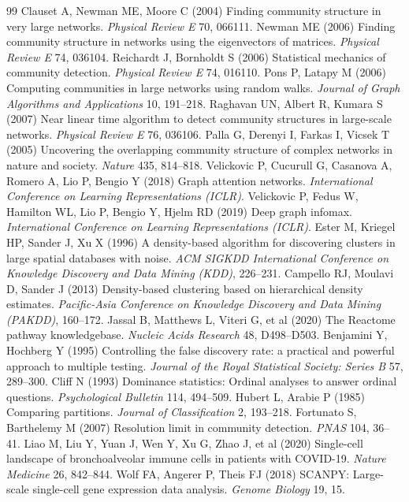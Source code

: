 \documentclass[twocolumn,10pt,letterpaper]{article}
\begin{document}
{\begin{thebibliography}{99}
 Clauset A, Newman ME, Moore C (2004) Finding community structure in very large networks. \textit{Physical Review E} 70, 066111.
 Newman ME (2006) Finding community structure in networks using the eigenvectors of matrices. \textit{Physical Review E} 74, 036104.
 Reichardt J, Bornholdt S (2006) Statistical mechanics of community detection. \textit{Physical Review E} 74, 016110.
 Pons P, Latapy M (2006) Computing communities in large networks using random walks. \textit{Journal of Graph Algorithms and Applications} 10, 191--218.
 Raghavan UN, Albert R, Kumara S (2007) Near linear time algorithm to detect community structures in large-scale networks. \textit{Physical Review E} 76, 036106.
 Palla G, Derenyi I, Farkas I, Vicsek T (2005) Uncovering the overlapping community structure of complex networks in nature and society. \textit{Nature} 435, 814--818.
 Velickovic P, Cucurull G, Casanova A, Romero A, Lio P, Bengio Y (2018) Graph attention networks. \textit{International Conference on Learning Representations (ICLR)}.
 Velickovic P, Fedus W, Hamilton WL, Lio P, Bengio Y, Hjelm RD (2019) Deep graph infomax. \textit{International Conference on Learning Representations (ICLR)}.
 Ester M, Kriegel HP, Sander J, Xu X (1996) A density-based algorithm for discovering clusters in large spatial databases with noise. \textit{ACM SIGKDD International Conference on Knowledge Discovery and Data Mining (KDD)}, 226--231.
 Campello RJ, Moulavi D, Sander J (2013) Density-based clustering based on hierarchical density estimates. \textit{Pacific-Asia Conference on Knowledge Discovery and Data Mining (PAKDD)}, 160--172.
 Jassal B, Matthews L, Viteri G, et al (2020) The Reactome pathway knowledgebase. \textit{Nucleic Acids Research} 48, D498--D503.
 Benjamini Y, Hochberg Y (1995) Controlling the false discovery rate: a practical and powerful approach to multiple testing. \textit{Journal of the Royal Statistical Society: Series B} 57, 289--300.
 Cliff N (1993) Dominance statistics: Ordinal analyses to answer ordinal questions. \textit{Psychological Bulletin} 114, 494--509.
 Hubert L, Arabie P (1985) Comparing partitions. \textit{Journal of Classification} 2, 193--218.
 Fortunato S, Barthelemy M (2007) Resolution limit in community detection. \textit{PNAS} 104, 36--41.
 Liao M, Liu Y, Yuan J, Wen Y, Xu G, Zhao J, et al (2020) Single-cell landscape of bronchoalveolar immune cells in patients with COVID-19. \textit{Nature Medicine} 26, 842--844.
 Wolf FA, Angerer P, Theis FJ (2018) SCANPY: Large-scale single-cell gene expression data analysis. \textit{Genome Biology} 19, 15.
\end{thebibliography}
}
\end{document}
